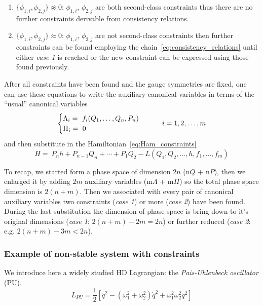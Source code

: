 \begin{enumerate}
  \item $\{\phi_{1,i}, \phi_{2,j}\} \not\approx 0$: $\phi_{1,i}$, $\phi_{2,j}$ are
    both second-class constraints thus there are no further constraints
    derivable from consistency relations.
  \item $\{\phi_{1,i}, \phi_{2,j}\} \approx 0$: $\phi_{1,i}$, $\phi_{2,j}$ are
    not second-class constraints then further constraints can be found employing
    the chain~\eqref{eq:consistency_relations} until either \emph{case 1} is
    reached or the new constraint can be expressed using those found previously.
\end{enumerate}

After all constraints have been found and the gauge symmetries are fixed, one
can use these equations to write the auxiliary canonical variables in terms of
the ``usual'' canonical variables
\begin{equation} \label{eq:constraints_in_terms_of_canonical_vars}
  \begin{cases}
    \Lambda_i =\ f_i(Q_1, \ldots, Q_n, P_n) \\
    \Pi_i =\ 0
  \end{cases}
  \qquad i = 1, 2, \ldots, m \\
\end{equation}
and then substitute in the Hamiltonian~\eqref{eq:Ham_constraints}
\begin{equation*}
  H =\ P_n h + P_{n-1} Q_n + \cdots + P_1 Q_2
     - L ( Q_1, Q_2, \ldots, h, f_1, \ldots, f_m)
\end{equation*}

To recap, we started form a phase space of dimension $2n$ (n$Q$ + n$P$), then we
enlarged it by adding $2m$ auxiliary variables (m$\Lambda$ + m$\Pi$) so the
total phase space dimension is $2(n+m)$. Then we associated with every pair of
canonical auxiliary variables two constraints (\emph{case 1}) or more
(\emph{case 2}) have been found. During the last substitution the dimension of
phase space is bring down to it's original dimensions (\emph{case 1}: $2(n+m) -
2m = 2n$) or further reduced (\emph{case 2}: e.g. $2(n+m) - 3m < 2n$).

\subsubsection{Example of non-stable system with constraints}
We introduce here a widely studied HD Lagrangian: the
\emph{Pais-Uhlenbeck oscillator} (PU).
\begin{equation} \label{eq:lagrangian_PU}
  L_{PU} = \frac{1}{2} \left[
    \ddot{q}^2 - (\omega_1^2 + \omega_2^2) \dot{q}^2 + \omega_1^2 \omega_2^2 q^2
  \right]
\end{equation}


